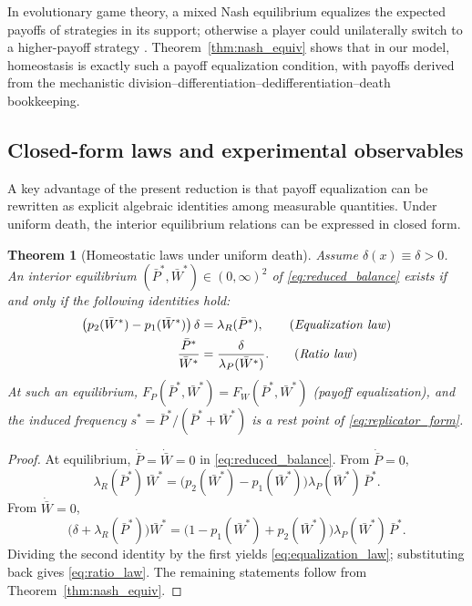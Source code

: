 \documentclass[pdflatex,sn-mathphys-ay]{sn-jnl}
\theoremstyle{thmstyleone}
\newtheorem{theorem}{Theorem}[section]
\theoremstyle{definition}
\theoremstyle{remark}
\begin{document}
In evolutionary game theory, a mixed Nash equilibrium equalizes the expected payoffs of strategies
in its support; otherwise a player could unilaterally switch to a higher-payoff strategy
\citep{hofbauer_evolutionary_1998}. Theorem~\ref{thm:nash_equiv} shows that in our model,
homeostasis is exactly such a payoff equalization condition, with payoffs derived from the
mechanistic division--differentiation--dedifferentiation--death bookkeeping.  

\subsection{Closed-form laws and experimental observables}
\label{subsec:closed_form_laws}
A key advantage of the present reduction is that payoff equalization can be rewritten as explicit
algebraic identities among measurable quantities. Under uniform death, the interior equilibrium
relations can be expressed in closed form.

\begin{theorem}[Homeostatic laws under uniform death]
\label{thm:equalization_ratio_laws}
Assume $\delta(x)\equiv\delta>0$. An interior equilibrium $(\bar P^*,\bar W^*)\in(0,\infty)^2$ of
\eqref{eq:reduced_balance} exists if and only if the following identities hold:
\begin{align}
\label{eq:equalization_law}
\big(p_2(\bar W^*)-p_1(\bar W^*)\big)\,\delta &= \lambda_R(\bar P^*),
\qquad\text{(\emph{Equalization law})}\\
\label{eq:ratio_law}
\frac{\bar P^*}{\bar W^*} &= \frac{\delta}{\lambda_P(\bar W^*)}.
\qquad\text{(\emph{Ratio law})}
\end{align}
At such an equilibrium, $F_P(\bar P^*,\bar W^*)=F_W(\bar P^*,\bar W^*)$ (payoff equalization),
and the induced frequency $s^*=\bar P^*/(\bar P^*+\bar W^*)$ is a rest point of
\eqref{eq:replicator_form}.
\end{theorem}

\begin{proof}
At equilibrium, $\dot{\bar P}=\dot{\bar W}=0$ in \eqref{eq:reduced_balance}. From $\dot{\bar P}=0$,
\[
\lambda_R(\bar P^*)\,\bar W^*=\big(p_2(\bar W^*)-p_1(\bar W^*)\big)\lambda_P(\bar W^*)\,\bar P^*.
\]
From $\dot{\bar W}=0$,
\[
\big(\delta+\lambda_R(\bar P^*)\big)\bar W^*
=\big(1-p_1(\bar W^*)+p_2(\bar W^*)\big)\lambda_P(\bar W^*)\,\bar P^*.
\]
Dividing the second identity by the first yields \eqref{eq:equalization_law}; substituting back
gives \eqref{eq:ratio_law}. The remaining statements follow from
Theorem~\ref{thm:nash_equiv}.
\end{proof}
\end{document}

